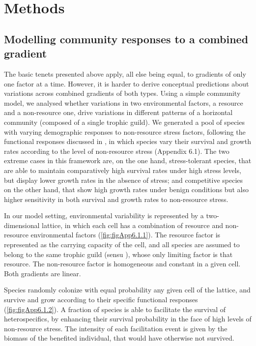 \section{Methods}

\subsection*{Modelling community responses to a combined gradient}

The basic tenets presented above apply, all else being equal, to gradients of only one factor at a time. However, it is harder to derive conceptual predictions about variations across combined gradients of both types. Using a simple community model, we analysed whether variations in two environmental factors, a resource and a non-resource one, drive variations in different patterns of a horizontal community (composed of a single trophic guild). We generated a pool of species with varying demographic responses to non-resource stress factors, following the functional responses discussed in \cite{Maestre2009}, in which species vary their survival and growth rates according to the level of non-resource stress (Appendix 6.1). The two extreme cases in this framework are, on the one hand, stress-tolerant species, that are able to maintain comparatively high survival rates under high stress levels, but display lower growth rates in the absence of stress; and competitive species on the other hand, that show high growth rates under benign conditions but also higher sensitivity in both survival and growth rates to non-resource stress.

In our model setting, environmental variability is represented by a two-dimensional lattice, in which each cell has a combination of resource and non-resource environmental factors (\cref{fig:figApp6.1.1}). The resource factor is represented as the carrying capacity of the cell, and all species are assumed to belong to the same trophic guild (sensu \citealt{Fauth1996}), whose only limiting factor is that resource. The non-resource factor is homogeneous and constant in a given cell. Both gradients are linear.

Species randomly colonize with equal probability any given cell of the lattice, and survive and grow according to their specific functional responses (\cref{fig:figApp6.1.2}). A fraction of species is able to facilitate the survival of heterospecifics, by enhancing their survival probability in the face of high levels of non-resource stress. The intensity of each facilitation event is given by the biomass of the benefited individual, that would have otherwise not survived.

